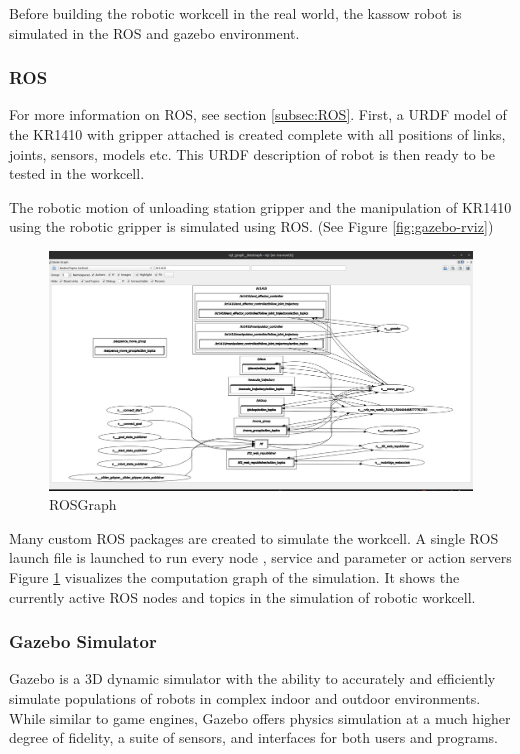 Before building the robotic workcell in the real world, the kassow robot is simulated in the ROS and gazebo environment.

\subsubsection{ROS}
\label{subsubsec:ROS}
For more information on ROS, see section \ref{subsec:ROS}. First, a URDF model of the KR1410 with gripper attached is created
complete with all positions of links, joints, sensors, models etc. This URDF description of robot is then ready to be tested
in the workcell.

The robotic motion of unloading station gripper and the manipulation of KR1410 using the robotic gripper is simulated using ROS. (See Figure \ref{fig:gazebo-rviz})

\begin{figure}[h]
    \centering
    \includegraphics[width=\textwidth]{figures/rosgraph.png}
    \caption{ROSGraph}
    \label{fig:rosgraph}
\end{figure}

Many custom ROS packages \cite{rospackage} are created to simulate the workcell. A single ROS launch \cite{roslaunch} file is launched to run every node \cite{rosnode}, service \cite{rosservice} and parameter \cite{parameterserver} or action servers \cite{actionserver}
Figure \ref{fig:rosgraph} visualizes the computation graph of the simulation. It shows the currently active ROS nodes \cite{rosnode}
and topics \cite{rostopic} in the simulation of robotic workcell.


\subsubsection{Gazebo Simulator}
\label{subsubsec:gazebo}
Gazebo is a 3D dynamic simulator with the ability to accurately and efficiently simulate populations
of robots in complex indoor and outdoor environments. While similar to game engines, Gazebo
offers physics simulation at a much higher degree of fidelity, a suite of sensors, and interfaces for
both users and programs. \cite{gazebo-classic}

